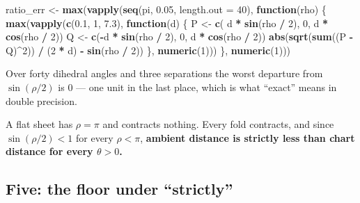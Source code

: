 \documentclass[
  british,
  a4paper,
]{book}
\newenvironment{Shaded}{\begin{snugshade}}{\end{snugshade}}
\newcommand{\AttributeTok}[1]{\textcolor[rgb]{0.13,0.29,0.53}{#1}}
\newcommand{\ControlFlowTok}[1]{\textcolor[rgb]{0.13,0.29,0.53}{\textbf{#1}}}
\newcommand{\DecValTok}[1]{\textcolor[rgb]{0.00,0.00,0.81}{#1}}
\newcommand{\FloatTok}[1]{\textcolor[rgb]{0.00,0.00,0.81}{#1}}
\newcommand{\FunctionTok}[1]{\textcolor[rgb]{0.13,0.29,0.53}{\textbf{#1}}}
\newcommand{\NormalTok}[1]{#1}
\newcommand{\OtherTok}[1]{\textcolor[rgb]{0.56,0.35,0.01}{#1}}
\newcommand{\SpecialCharTok}[1]{\textcolor[rgb]{0.81,0.36,0.00}{\textbf{#1}}}
\begin{document}
\begin{Shaded}
\begin{Highlighting}[]
\NormalTok{ratio\_err }\OtherTok{\textless{}{-}} \FunctionTok{max}\NormalTok{(}\FunctionTok{vapply}\NormalTok{(}\FunctionTok{seq}\NormalTok{(pi, }\FloatTok{0.05}\NormalTok{, }\AttributeTok{length.out =} \DecValTok{40}\NormalTok{), }\ControlFlowTok{function}\NormalTok{(rho) \{}
  \FunctionTok{max}\NormalTok{(}\FunctionTok{vapply}\NormalTok{(}\FunctionTok{c}\NormalTok{(}\FloatTok{0.1}\NormalTok{, }\DecValTok{1}\NormalTok{, }\FloatTok{7.3}\NormalTok{), }\ControlFlowTok{function}\NormalTok{(d) \{}
\NormalTok{    P }\OtherTok{\textless{}{-}} \FunctionTok{c}\NormalTok{( d }\SpecialCharTok{*} \FunctionTok{sin}\NormalTok{(rho }\SpecialCharTok{/} \DecValTok{2}\NormalTok{), }\DecValTok{0}\NormalTok{, d }\SpecialCharTok{*} \FunctionTok{cos}\NormalTok{(rho }\SpecialCharTok{/} \DecValTok{2}\NormalTok{))}
\NormalTok{    Q }\OtherTok{\textless{}{-}} \FunctionTok{c}\NormalTok{(}\SpecialCharTok{{-}}\NormalTok{d }\SpecialCharTok{*} \FunctionTok{sin}\NormalTok{(rho }\SpecialCharTok{/} \DecValTok{2}\NormalTok{), }\DecValTok{0}\NormalTok{, d }\SpecialCharTok{*} \FunctionTok{cos}\NormalTok{(rho }\SpecialCharTok{/} \DecValTok{2}\NormalTok{))}
    \FunctionTok{abs}\NormalTok{(}\FunctionTok{sqrt}\NormalTok{(}\FunctionTok{sum}\NormalTok{((P }\SpecialCharTok{{-}}\NormalTok{ Q)}\SpecialCharTok{\^{}}\DecValTok{2}\NormalTok{)) }\SpecialCharTok{/}\NormalTok{ (}\DecValTok{2} \SpecialCharTok{*}\NormalTok{ d) }\SpecialCharTok{{-}} \FunctionTok{sin}\NormalTok{(rho }\SpecialCharTok{/} \DecValTok{2}\NormalTok{))}
\NormalTok{  \}, }\FunctionTok{numeric}\NormalTok{(}\DecValTok{1}\NormalTok{)))}
\NormalTok{\}, }\FunctionTok{numeric}\NormalTok{(}\DecValTok{1}\NormalTok{)))}
\end{Highlighting}
\end{Shaded}

Over forty dihedral angles and three separations the worst departure from
\(\sin(\rho/2)\) is 0 --- one unit in the last place, which
is what ``exact'' means in double precision.

A flat sheet has \(\rho = \pi\) and contracts nothing. Every fold contracts, and
since \(\sin(\rho/2) < 1\) for every \(\rho < \pi\), \textbf{ambient distance is strictly
less than chart distance for every \(\theta > 0\).}

\subsection{Five: the floor under ``strictly''}\label{five-the-floor-under-strictly}
\end{document}
